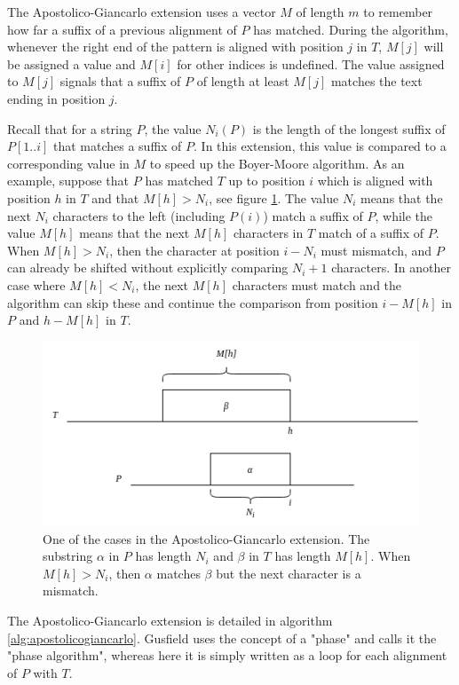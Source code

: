 The Apostolico-Giancarlo extension uses a vector $M$ of length $m$ to remember how far a suffix of a previous alignment of $P$ has matched. During the algorithm, whenever the right end of the pattern is aligned with position $j$ in $T$, $M[j]$ will be assigned a value and $M[i]$ for other indices is undefined. The value assigned to $M[j]$ signals that a suffix of $P$ of length at least $M[j]$ matches the text ending in position $j$. 

Recall that for a string $P$, the value $N_i(P)$ is the length of the longest suffix of $P[1..i]$ that matches a suffix of $P$. In this extension, this value is compared to a corresponding value in $M$ to speed up the Boyer-Moore algorithm. As an example, suppose that $P$ has matched $T$ up to position $i$ which is aligned with position $h$ in $T$ and that $M[h]>N_i$, see figure \ref{fig:Apostolicocase}. The value $N_i$ means that the next $N_i$ characters to the left (including $P(i)$) match a suffix of $P$, while the value $M[h]$ means that the next $M[h]$ characters in $T$ match of a suffix of $P$. When $M[h]>N_i$, then the character at position $i-N_i$ must mismatch, and $P$ can already be shifted without explicitly comparing $N_i+1$ characters. In another case where $M[h]<N_i$, the next $M[h]$ characters must match and the algorithm can skip these and continue the comparison from position $i-M[h]$ in $P$ and $h-M[h]$ in $T$. 

\begin{figure}[th!]
    \centering
    \includegraphics[width=.9\textwidth]{LaTeX/Figures/Zalg/Apostolicocase.png}
    \caption{One of the cases in the Apostolico-Giancarlo extension. The substring $\alpha$ in $P$ has length $N_i$ and $\beta$ in $T$ has length $M[h]$. When $M[h]>N_i$, then $\alpha$ matches $\beta$ but the next character is a mismatch. }
    \label{fig:Apostolicocase}
\end{figure}

The Apostolico-Giancarlo extension is detailed in algorithm \ref{alg:apostolicogiancarlo}. Gusfield\cite{Gusfield1997AlgorithmsOS} uses the concept of a "phase" and calls it the "phase algorithm", whereas here it is simply written as a loop for each alignment of $P$ with $T$. 

